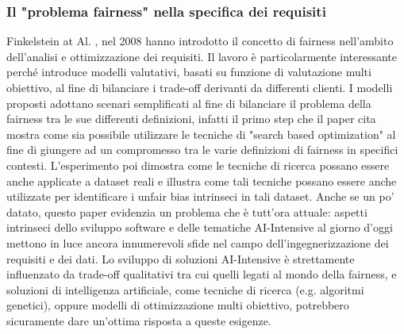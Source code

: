 \subsubsection{Il "problema fairness" nella specifica dei requisiti}
Finkelstein at Al. \cite{finkelstein2008fairness}, nel 2008 hanno introdotto il concetto di fairness nell'ambito dell'analisi e ottimizzazione dei requisiti. Il lavoro è particolarmente interessante perché introduce modelli valutativi, basati su funzione di valutazione multi obiettivo, al fine di bilanciare i trade-off derivanti da differenti clienti. I modelli proposti adottano scenari semplificati al fine di bilanciare il problema della fairness tra le sue differenti definizioni, infatti il primo step che il paper cita mostra come sia possibile utilizzare le tecniche di "search based optimization" al fine di giungere ad un compromesso tra le varie definizioni di fairness in specifici contesti. L'esperimento poi dimostra come le tecniche di ricerca possano essere anche applicate a dataset reali e illustra come tali tecniche possano essere anche utilizzate per identificare i unfair bias intrinseci in tali dataset. Anche se un po' datato, questo paper evidenzia un problema che è tutt'ora attuale: aspetti intrinseci dello sviluppo software e delle tematiche AI-Intensive al giorno d'oggi mettono in luce ancora innumerevoli sfide nel campo dell'ingegnerizzazione dei requisiti e dei dati. Lo sviluppo di soluzioni AI-Intensive è strettamente influenzato da trade-off qualitativi tra cui quelli legati al mondo della fairness, e soluzioni di intelligenza artificiale, come tecniche di ricerca (e.g. algoritmi genetici), oppure modelli di ottimizzazione multi obiettivo, potrebbero sicuramente dare un'ottima risposta a queste esigenze.

